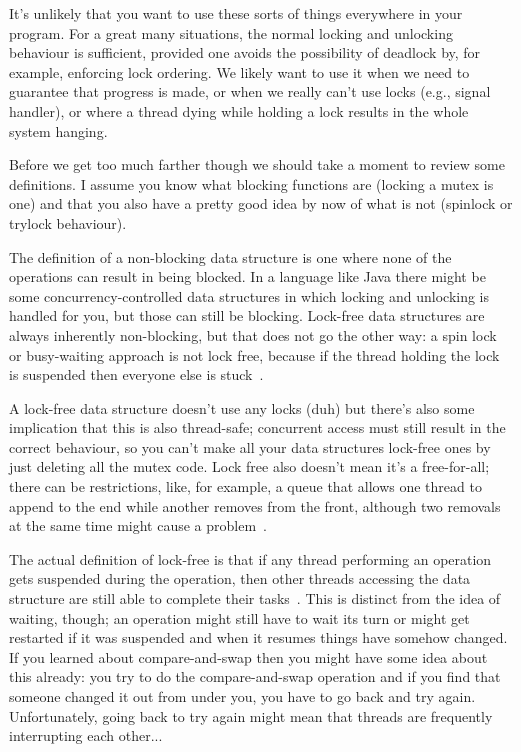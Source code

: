 \documentclass[a4paper]{report}
\begin{document}
It's unlikely that you want to use these sorts of things everywhere in your program. For a great many situations, the normal locking and unlocking behaviour is sufficient, provided one avoids the possibility of deadlock by, for example, enforcing lock ordering. We likely want to use it when we need to guarantee that progress is made, or when we really can't use locks (e.g., signal handler), or where a thread dying while holding a lock results in the whole system hanging.

Before we get too much farther though we should take a moment to review some definitions. I assume you know what blocking functions are (locking a mutex is one) and that you also have a pretty good idea by now of what is not (spinlock or trylock behaviour). 

The definition of a non-blocking data structure is one where none of the operations can result in being blocked. In a language like Java there might be some concurrency-controlled data structures in which locking and unlocking is handled for you, but those can still be blocking. Lock-free data structures are always inherently non-blocking, but that does not go the other way: a spin lock or busy-waiting approach is not lock free, because if the thread holding the lock is suspended then everyone else is stuck~\cite{nblfwf}.

A lock-free data structure doesn't use any locks (duh) but there's also some implication that this is also thread-safe; concurrent access must still result in the correct behaviour, so you can't make all your data structures lock-free ones by just deleting all the mutex code. Lock free also doesn't mean it's a free-for-all; there can be restrictions, like, for example, a queue that allows one thread to append to the end while another removes from the front, although two removals at the same time might cause a problem~\cite{nblfwf}.

The actual definition of lock-free is that if any thread performing an operation gets suspended during the operation, then other threads accessing the data structure are still able to complete their tasks~\cite{nblfwf}. This is distinct from the idea of waiting, though; an operation might still have to wait its turn or might get restarted if it was suspended and when it resumes things have somehow changed. If you learned about compare-and-swap then you might have some idea about this already: you try to do the compare-and-swap operation and if you find that someone changed it out from under you, you have to go back and try again. Unfortunately, going back to try again might mean that threads are frequently interrupting each other...
\end{document}
